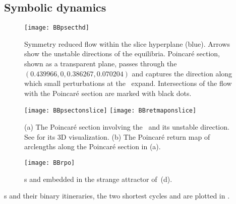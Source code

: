 \subsection{Symbolic dynamics}

\begin{figure}%
\centering
 \texttt{[image: BBpsecthd]}
\caption{
Symmetry reduced flow within the slice hyperplane (blue). Arrows
show the unstable directions of the equilibria. Poincar\'e section, shown as
a transparent plane, passes through the \reqv\ $(0.439966, 0, 0.386267, 0.070204)$
and captures the direction along which small perturbations at the \reqv\ expand.
Intersections of the flow with the Poincar\'e section are marked with black dots.
}
\label{fig:BBpsecthd}
\end{figure}

\begin{figure}
\centering
  \texttt{[image: BBpsectonslice]}
  \texttt{[image: BBretmaponslice]}
\caption{(a) The Poincar\'e section involving the \reqv\ and its unstable direction.
		  See  for its 3D visualization.
		  (b) The Poincar\'e return map of arclengths along the Poincar\'e section
		  in (a).}
\label{fig:psectandretmap}
\end{figure}



\begin{figure}%
  \begin{center}
  \texttt{[image: BBrpo]}
  \end{center}
  \caption{
	\Rpo s  and  embedded in the strange attractor
    of \,(d).
    }
  \label{fig:BBrpo1-01}
\end{figure}

\rpo s and their binary itineraries, the two shortest cycles
 and  are plotted in
.


